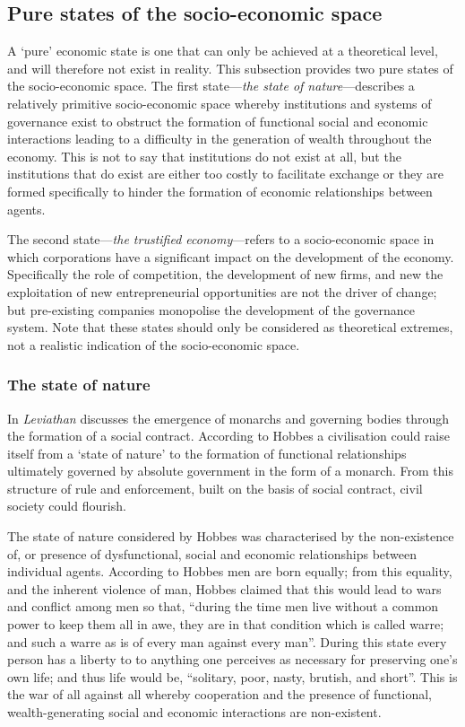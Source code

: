 \subsection{Pure states of the socio-economic space}

A `pure' economic state is one that can only be achieved at a theoretical level, and will therefore not exist in reality. This subsection provides two pure states of the socio-economic space. The first state---\emph{the state of nature}---describes a relatively primitive socio-economic space whereby institutions and systems of governance exist to obstruct the formation of functional social and economic interactions leading to a difficulty in the generation of wealth throughout the economy. This is not to say that institutions do not exist at all, but the institutions that do exist are either too costly to facilitate exchange or they are formed specifically to hinder the formation of economic relationships between agents. 

The second state---\emph{the trustified economy}---refers to a socio-economic space in which corporations have a significant impact on the development of the economy. Specifically the role of competition, the development of new firms, and new the exploitation of new entrepreneurial opportunities are not the driver of change; but pre-existing companies monopolise the development of the governance system. Note that these states should only be considered as theoretical extremes, not a realistic indication of the socio-economic space.

\subsubsection{The state of nature}

In \emph{Leviathan} \citet{Hobbes1651} discusses the emergence of monarchs and governing bodies through the formation of a social contract. According to Hobbes a civilisation could raise itself from a `state of nature' to the formation of functional relationships ultimately governed by absolute government in the form of a monarch. From this structure of rule and enforcement, built on the basis of social contract, civil society could flourish.

The state of nature considered by Hobbes was characterised by the non-existence of, or presence of dysfunctional, social and economic relationships between individual agents. According to Hobbes men are born equally; from this equality, and the inherent violence of man, Hobbes claimed that this would lead to wars and conflict among men so that, ``during the time men live without a common power to keep them all in awe, they are in that condition which is called warre; and such a warre as is of every man against every man''. During this state every person has a liberty to to anything one perceives as necessary for preserving one's own life; and thus life would be, ``solitary, poor, nasty, brutish, and short''. This is the war of all against all whereby cooperation and the presence of functional, wealth-generating social and economic interactions are non-existent.


